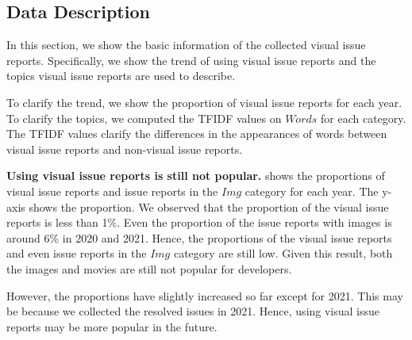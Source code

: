 


\subsection{Data Description}
In this section, we show the basic information of 
the collected visual issue reports. 
Specifically, we show the trend of using 
visual issue reports and 
the topics visual issue reports are used to describe.

To clarify the trend, we show the proportion of 
visual issue reports for each year. 
To clarify the topics, we computed the TFIDF values 
on $Words$ for each category. 
The TFIDF values clarify the differences in the appearances of 
words between visual issue reports and 
non-visual issue reports. 

\textbf{Using visual issue reports is still not popular.} 
 shows the proportions of 
visual issue reports and issue reports in the $Img$ category 
for each year. 
The y-axis shows the proportion. 
We observed that the proportion of the visual issue reports is 
less than 1\%. 
Even the proportion of the issue reports with images is around 6\% 
in 2020 and 2021. 
Hence, the proportions of the visual issue reports and 
even issue reports in the $Img$ category are still low. 
Given this result, both the images and movies are still not 
popular for developers. 

However, the proportions have slightly increased so far 
except for 2021. 
This may be because we collected the resolved issues 
in 2021. 
Hence, using visual issue reports may be more popular in the future. 




